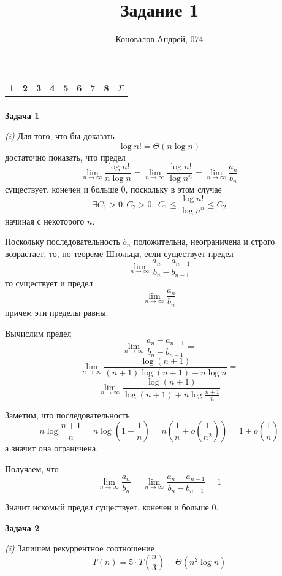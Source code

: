 \documentclass[10pt]{article}
\title{Задание 1}
\author{Коновалов Андрей, 074}
\date{}
\begin{document}
\maketitle

\noindent
\begin{tabularx}{\textwidth}{|C|C|C|C|C|C|C|C|C|}
   & 2 & 3 & 4 & 5 & 6 & 7 & 8 & $\Sigma$ \\
  \hline
  &&&&&&&& \\
  \hline
\end{tabularx}

\bigskip

{\bf Задача 1}

{\it (i)}
Для того, что бы доказать
$$
  \log{n!} = \Theta (n \log{n})
$$
достаточно показать, что предел
$$
  \lim\limits_{n \to \infty} \frac{\log{n!}}{n \log{n}} =
  \lim\limits_{n \to \infty} \frac{\log{n!}}{\log{n^n}} =
  \lim\limits_{n \to \infty} \frac{a_n}{b_n}
$$
существует, конечен и больше 0, поскольку в этом случае
$$
  \exists C_1 > 0, C_2 > 0: \; C_1 \leq \frac{\log{n!}}{\log{n^n}} \leq C_2
$$
начиная с некоторого $n$.

Поскольку последовательность $b_n$ положительна, неограничена и строго возрастает, то, по теореме Штольца, если существует предел
$$
  \lim\limits_{n \to \infty} \frac{a_n - a_{n - 1}}{b_n - b_{n - 1}}
$$
то существует и предел
$$
  \lim\limits_{n \to \infty} \frac{a_n}{b_n}
$$
причем эти пределы равны.

Вычислим предел
$$\lim\limits_{n \to \infty} \frac{a_n - a_{n - 1}}{b_n - b_{n - 1}} =$$
$$\lim\limits_{n \to \infty} \frac{\log{(n + 1)}}{(n + 1) \log{(n + 1)} - n \log{n}} =$$
$$\lim\limits_{n \to \infty} \frac{\log{(n + 1)}}{\log{(n + 1)} + n \log{\frac{n + 1}{n}}}$$

Заметим, что последовательность
$$
  n \log{\frac{n + 1}{n}} =
  n \log{\left(1 + \frac{1}{n}\right)} =
  n \left(\frac{1}{n} + o\left(\frac{1}{n^2}\right)\right) =
  1 + o\left(\frac{1}{n}\right)
$$
а значит она ограничена.

Получаем, что
$$
  \lim\limits_{n \to \infty} \frac{a_n}{b_n} =
  \lim\limits_{n \to \infty} \frac{a_n - a_{n - 1}}{b_n - b_{n - 1}} =
  1
$$

Значит искомый предел существует, конечен и больше 0.

\medskip

{\bf Задача 2}

{\it (i)}
Запишем рекуррентное соотношение
$$
  T(n) = 5 \cdot T\left(\frac{n}{3}\right) + \Theta(n^2 \log{n})
$$
\end{document}
